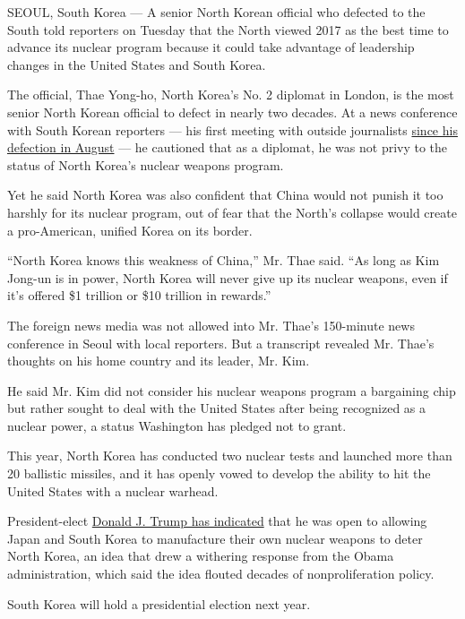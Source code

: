 SEOUL, South Korea --- A senior North Korean official who defected to
the South told reporters on Tuesday that the North viewed 2017 as the
best time to advance its nuclear program because it could take advantage
of leadership changes in the United States and South Korea.

The official, Thae Yong-ho, North Korea's No. 2 diplomat in London, is
the most senior North Korean official to defect in nearly two decades.
At a news conference with South Korean reporters --- his first meeting
with outside journalists
\href{https://www.nytimes.com/2016/08/18/world/asia/north-korea-defector-thae-yong-ho-britain.html}{since
his defection in August} --- he cautioned that as a diplomat, he was not
privy to the status of North Korea's nuclear weapons program.

Yet he said North Korea was also confident that China would not punish
it too harshly for its nuclear program, out of fear that the North's
collapse would create a pro-American, unified Korea on its border.

``North Korea knows this weakness of China,'' Mr. Thae said. ``As long
as Kim Jong-un is in power, North Korea will never give up its nuclear
weapons, even if it's offered \$1 trillion or \$10 trillion in
rewards.''

The foreign news media was not allowed into Mr. Thae's 150-minute news
conference in Seoul with local reporters. But a transcript revealed Mr.
Thae's thoughts on his home country and its leader, Mr. Kim.

He said Mr. Kim did not consider his nuclear weapons program a
bargaining chip but rather sought to deal with the United States after
being recognized as a nuclear power, a status Washington has pledged not
to grant.

This year, North Korea has conducted two nuclear tests and launched more
than 20 ballistic missiles, and it has openly vowed to develop the
ability to hit the United States with a nuclear warhead.

President-elect
\href{https://www.nytimes.com/2016/03/27/us/politics/donald-trump-foreign-policy.html}{Donald
J. Trump has indicated} that he was open to allowing Japan and South
Korea to manufacture their own nuclear weapons to deter North Korea, an
idea that drew a withering response from the Obama administration, which
said the idea flouted decades of nonproliferation policy.

South Korea will hold a presidential election next year.

